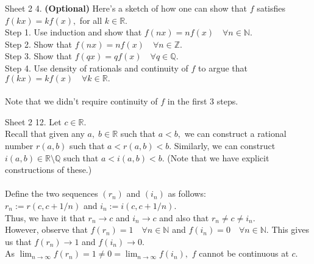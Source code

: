 \documentclass[handout, aspectratio=169]{beamer}
\begin{document}
\begin{frame}{Sheet 2}
	4. \textbf{(Optional)} Here's a sketch of how one can show that $f$ satisfies $f(kx) = kf(x),$ for all $k \in \mathbb{R}.$\\
	Step 1. Use induction and show that $f(nx) = nf(x) \quad \forall n \in \mathbb{N}.$\\
	Step 2. Show that $f(nx) = nf(x) \quad \forall n \in \mathbb{Z}.$\\
	Step 3. Show that $f(qx) = qf(x) \quad \forall q \in \mathbb{Q}.$\\
	Step 4. Use density of rationals and continuity of $f$ to argue that $f(kx) = kf(x) \quad \forall k \in \mathbb{R}.$\\~\\
	Note that we didn't require continuity of $f$ in the first 3 steps.
\end{frame}
\begin{frame}{Sheet 2}
	12. Let $c \in \mathbb{R}.$\\
	Recall that given any $a,\;b\in\mathbb{R}$ such that $a < b,$ we can construct a rational number $r(a, b)$ such that $a < r(a, b) < b.$ Similarly, we can construct $i(a, b) \in \mathbb{R}\setminus\mathbb{Q}$ such that $a < i(a, b) < b.$ (Note that we have explicit constructions of these.)\\~\\
	Define the two sequences $(r_n)$ and $(i_n)$ as follows:\\
	$r_n := r(c, c+1/n)$ and $i_n := i(c, c + 1/n).$\\
	Thus, we have it that $r_n \to c$ and $i_n \to c$ and also that $r_n \neq c \neq i_n.$\\
	However, observe that $f(r_n) = 1 \quad \forall n \in \mathbb{N}$ and $f(i_n) = 0 \quad \forall n \in \mathbb{N}.$ This gives us that $f(r_n) \to 1$ and $f(i_n) \to 0.$\\
	As $\displaystyle\lim_{n\to \infty}f(r_n) = 1 \neq 0 = \lim_{n\to \infty}f(i_n),$ $f$ cannot be continuous at $c.$ 
\end{frame}
\end{document}
